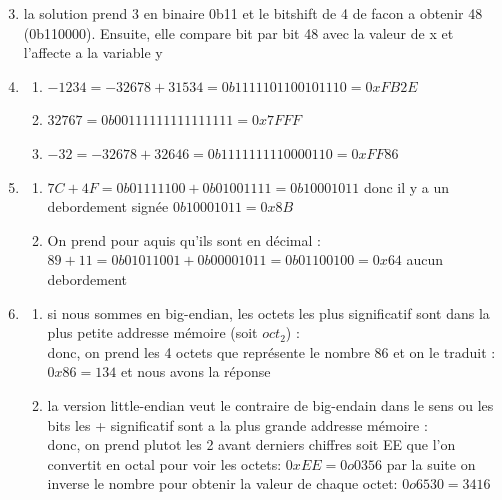 \documentclass{article}
\begin{document}
\begin{enumerate}
	\setcounter{enumi}{2}
	\item
	      la solution prend 3 en binaire 0b11 et le bitshift de 4 de facon a obtenir 48
	      (0b110000). Ensuite, elle compare bit par bit 48 avec la valeur de x et l'affecte a la variable y
	\item
	      \begin{enumerate}[label=\alph*)]
	      	\item $-1234 = -32678 + 31534 = 0b1111101100101110 = 0xFB2E$
	      	\item $32767 =  0b00111111111111111 = 0x7FFF$
	      	\item $-32 =  -32678 + 32646 = 0b1111111110000110  = 0xFF86$
	      \end{enumerate}
	\item
	      \begin{enumerate}[label=\alph*)]
	      	\item $7C +4F = 0b01111100 + 0b01001111 = 0b10001011$ donc il y a un debordement sign\'ee
	      	      $ 0b10001011 = 0x8B$
	      	\item On prend pour aquis qu'ils sont en d\'ecimal :
	      	      $89 + 11 = 0b01011001 + 0b00001011 = 0b01100100 = 0x64$ aucun debordement
	      \end{enumerate}
	\item
	      \begin{enumerate}[label=\alph*)]
	      	\item si nous sommes en big-endian, les octets les plus significatif sont dans la plus petite addresse m\'emoire (soit $oct_2$) :\\
	      	      donc, on prend les 4 octets que repr\'esente le nombre 86 et on le traduit :  $0x86 = 134$ et nous avons la r\'eponse

	      	\item la version little-endian veut le contraire de big-endain dans le sens ou les bits les + significatif sont a la plus grande addresse m\'emoire :\\
	      	      donc, on prend plutot les 2 avant derniers chiffres soit EE que l'on convertit en octal pour voir les octets: $0xEE = 0o0356$ par la suite on inverse le nombre pour obtenir la valeur de chaque octet:
	      	      $0o6530 = 3416$

	      \end{enumerate}
\end{enumerate}

\newpage
\end{document}
